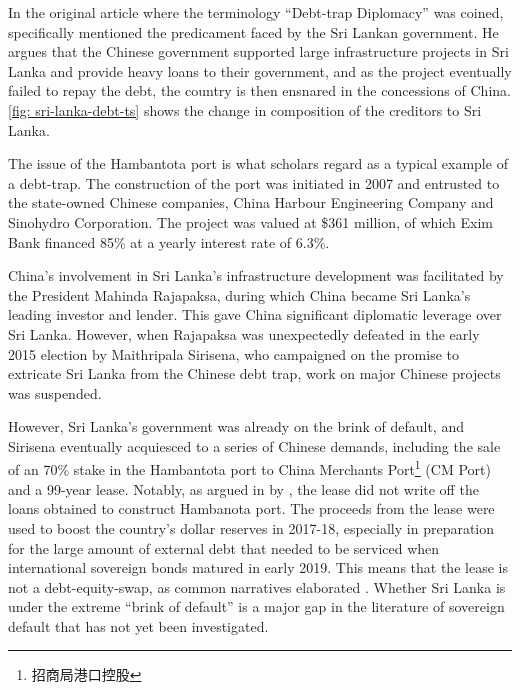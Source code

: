 In the original article where the terminology ``Debt-trap Diplomacy'' was coined, \citeauthor{Chellaney_2017} specifically mentioned the predicament faced by the Sri Lankan government. He argues that the Chinese government supported large infrastructure projects in Sri Lanka and provide heavy loans to their government, and as the project eventually failed to repay the debt, the country is then ensnared in the concessions of China. \autoref{fig: sri-lanka-debt-ts} shows the change in composition of the creditors to Sri Lanka.

The issue of the Hambantota port is what scholars regard as a typical example of a debt-trap\citep*{Moramudali_2020}.
The construction of the port was initiated in 2007 and entrusted to the state-owned Chinese companies, China Harbour Engineering Company and Sinohydro Corporation. The project was valued at \$361 million, of which Exim Bank financed 85\% at a yearly interest rate of 6.3\%.

China's involvement in Sri Lanka's infrastructure development was facilitated by the President Mahinda Rajapaksa, during which China became Sri Lanka's leading investor and lender. This gave China significant diplomatic leverage over Sri Lanka. 
However, when Rajapaksa was unexpectedly defeated in the early 2015 election by Maithripala Sirisena, who campaigned on the promise to extricate Sri Lanka from the Chinese debt trap, work on major Chinese projects was suspended.

However, Sri Lanka's government was already on the brink of default, and Sirisena eventually acquiesced to a series of Chinese demands, including the sale of an 70\% stake in the Hambantota port to China Merchants Port\footnote{招商局港口控股} (CM Port) and a 99-year lease. Notably, as argued in by \citet*{Moramudali_2019}, the lease did not write off the loans obtained to construct Hambanota port. The proceeds from the lease were used to boost the country's dollar reserves in 2017-18, especially in preparation for the large amount of external debt that needed to be serviced when international sovereign bonds matured in early 2019. This means that the lease is not a debt-equity-swap, as common narratives elaborated \citep*{Moramudali_2020}.
Whether Sri Lanka is under the extreme ``brink of default'' is a major gap in the literature of sovereign default that has not yet been investigated.

